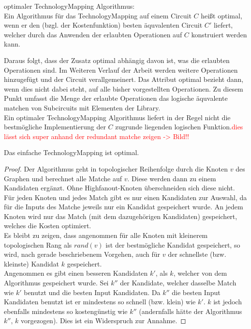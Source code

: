 \documentclass[11pt, a4paper, german]{article}
\newcommand{\TM}{TechnologyMapping }
\begin{document}
\begin{definition}{optimaler \TM Algorithmus:}\\
	Ein Algorithmus für das \TM auf einem Circuit $C$ heißt optimal, wenn er den (bzgl. der Kostenfunktion) besten äquvalenten Circuit $C'$ liefert, welcher durch das Anwenden der erlaubten Operationen auf $C$ konstruiert werden kann. 
\end{definition}
Daraus folgt, dass der Zusatz optimal abhängig davon ist, was die erlaubten Operationen sind.
Im Weiteren Verlauf der Arbeit werden weitere Operationen hinzugefügt und der Circuit verallgemeinert. Das Attribut optimal bezieht dann, wenn dies nicht dabei steht,  auf alle bisher vorgestellten Operationen. Zu diesem Punkt umfasst die Menge der erlaubte Operationen das logische äquvalente matchen von Subcircuits mit Elementen der Library.\\

Ein optimaler \TM Algorithmus liefert in der Regel nicht die bestmögliche Implementierung der $C$ zugrunde liegenden logischen Funktion.\textcolor{red}{dies lässt sich super anhand der redundant matche zeigen -> Bild!!} \\

\begin{cor}
	Das einfache \TM ist optimal. 
\end{cor}
\begin{proof}
	Der Algorithmus geht in topologischer Reihenfolge durch die Knoten $v$ des Graphen und berechnet alle Matche auf $v$. Diese werden dann zu einem Kandidaten ergänzt. 
 Ohne Highfanout-Knoten überschneiden sich diese nicht. Für jeden Knoten und jedes Match gibt es nur einen Kandidaten zur Auswahl, da für die Inputs des Matche jeweils nur ein Kandidat gespeichert wurde. An jedem Knoten wird nur das Match (mit dem dazugehörigen Kandidaten) gespeichert, welches die Kosten optimiert. \\
 Es bleibt zu zeigen, dass angenommen für alle Knoten mit kleinerem topologischen Rang als $rand(v)$ ist der bestmögliche Kandidat gespeichert, so wird, nach gerade beschriebenem Vorgehen, auch für $v$ der schnellste (bzw. kleinste) Kandidat $k$ gespeichert. \\
 Angenommen es gibt einen besseren Kandidaten $k'$, als $k$, welcher von dem Algorithmus gespeichert wurde. Sei $k''$ der Kandidate, welcher dasselbe Match wie $k'$ benutzt und die besten Input Kandidaten. Da $k''$ die besten Input Kandidaten benutzt ist er mindestens so schnell (bzw. klein) wie $k'$. $k$ ist jedoch ebenfalls mindestens so kostengünstig wie $k''$ (andernfalls hätte der Algorithmus $k''$, $k$ vorgezogen). Dies ist ein Widerspruch zur Annahme. 
\end{proof}
 
\end{document}
